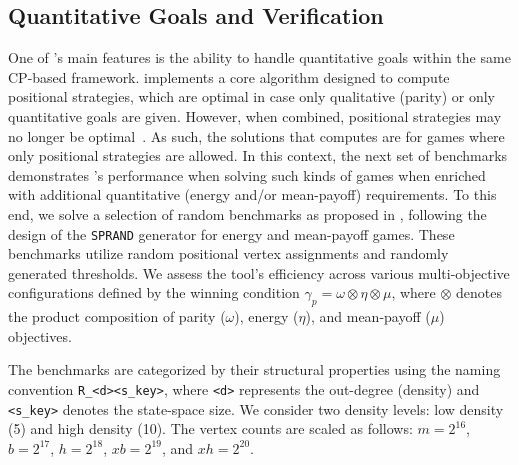 \documentclass[a4paper,UKenglish,cleveref, autoref, thm-restate]{lipics-v2021}
\begin{document}
\subsection{Quantitative Goals and Verification}

One of \nocq's main features is the ability to handle quantitative goals within the same CP-based framework. 
%
\nocq implements a core algorithm designed to compute positional strategies, which are optimal in case only qualitative (parity) or only quantitative goals are given. However, when combined, positional strategies may no longer be optimal~\cite{ChatterjeeHJ05,Chatterjee:2010}. As such, the solutions that \nocq computes are for games where only positional strategies are allowed. 
%
In this context, the next set of benchmarks demonstrates \nocq's performance when solving such kinds of games when enriched with additional quantitative (energy and/or mean-payoff) requirements.  
%
To this end, we solve a selection of random benchmarks as proposed in \cite{Chaloupka:2011}, following the design of the \texttt{SPRAND} generator \cite{CherkasskyBoris:1996} for energy and mean-payoff games. These benchmarks utilize random positional vertex assignments and randomly generated thresholds. We assess the tool's efficiency across various multi-objective configurations defined by the winning condition $\gamma_{p} = \omega \otimes \eta \otimes \mu$, where $\otimes$ denotes the product composition of parity ($\omega$), energy ($\eta$), and mean-payoff ($\mu$) objectives.

The benchmarks are categorized by their structural properties using the naming convention \texttt{R\_<d><s\_key>}, where \texttt{<d>} represents the out-degree (density) and \texttt{<s\_key>} denotes the state-space size. We consider two density levels: low density (5) and high density (10). The vertex counts are scaled as follows: $m = 2^{16}$, $b = 2^{17}$, $h = 2^{18}$, $xb = 2^{19}$, and $xh = 2^{20}$.
\end{document}
